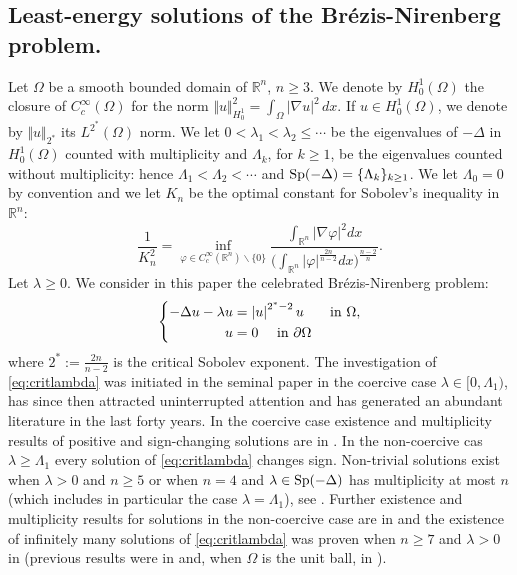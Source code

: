 \documentclass[10pt]{amsart}
\numberwithin{equation}{section}
\newcommand{\R}{\mathbb{R}}
\newcommand{\Sp}{{\rm Sp}}
\newcommand{\vp}{\varphi}
\newcommand{\Om}{\Omega}
\def \rr {\mathbb{R}}
\def \crit{2^{*}}
\theoremstyle{plain}
\theoremstyle{remark}
\begin{document}
\subsection{Least-energy solutions of the Br\'ezis-Nirenberg problem.} Let $\Omega$ be a smooth bounded domain of  $\rr^n$,  $n\geq 3$. We denote by $H_0^1(\Om)$ the closure of $C_c^{\infty}(\Om)$ for the norm $\Vert u \Vert_{H^1_0}^2 =  \int_{\Om} |\nabla u|^2\, dx$. If $u \in H^1_0(\Om)$, we denote by $\Vert u \Vert_{2^*}$ its $L^{2^*}(\Om)$ norm. We let  $0< \lambda_1 < \lambda_2 \le \cdots$ be the eigenvalues of $-\Delta$ in $H^1_0(\Om)$ counted with multiplicity and $\Lambda_k$, for $k \ge 1$, be the eigenvalues counted without multiplicity: hence $\Lambda_1 < \Lambda_2< \cdots$ and $\Sp(-\Delta) = \{ \Lambda_k\}_{k \ge 1}$. We let $\Lambda_0 = 0$ by convention and we let $K_n$ be the optimal constant for Sobolev's inequality in $\R^n$: 
\begin{equation} \label{defK0}
 \frac{1}{K_n^2} = \inf_{\vp \in C^\infty_c(\R^n) \backslash \{0\}} \frac{\int_{\R^n}|\nabla \vp|^2 dx}{\big(\int_{\R^n} |\vp|^{\frac{2n}{n-2}}dx \big)^{\frac{n-2}{n}}}. 
 \end{equation}
Let $\lambda \ge 0$. We consider in this paper the celebrated Br\'ezis-Nirenberg problem: 
\begin{equation}\label{eq:critlambda}
	\left\{\begin{aligned}
		-\Delta u -\lambda u & =\left|u\right|^{\crit-2}u &\hbox{ in } \Omega, \\
		u & = 0 \quad \text{ in } \partial \Om
	\end{aligned}\right.
\end{equation}
where $\crit:=\frac{2n}{n-2}$ is the critical Sobolev exponent. The investigation of \eqref{eq:critlambda} was initiated in the seminal paper \cite{BN} in the coercive case $\lambda \in [0, \Lambda_1)$, has since then  attracted uninterrupted attention and has generated an abundant literature in the last forty years. In the coercive case existence and multiplicity results of positive and sign-changing solutions are in \cite{BN, CapozziFortunatoPalmieri, CeramiSoliminiStruwe, ChenZou, ClappWeth2, FortunatoJannelli, HebeyVaugonNodal, RoselliWillem, TavaresYouZou}. In the non-coercive cas $\lambda \ge \Lambda_1$ every solution of \eqref{eq:critlambda} changes sign. Non-trivial solutions exist when $\lambda >0$ and $n \ge 5$ \cite{CapozziFortunatoPalmieri} or when $n = 4$ and $\lambda \in \Sp(-\Delta)$ has multiplicity at most $n$ (which includes in particular the case $\lambda = \Lambda_1$), see \cite{ClappWeth2}. Further existence and multiplicity results for solutions in the non-coercive case are  in \cite{ABP2, CeramiFortunatoStruwe, ClappWeth2, DevillanovaSolimini, FortunatoJannelli, SchechterZou, Solimini} and the existence of infinitely many solutions of \eqref{eq:critlambda} was proven when $n \ge 7$ and $\lambda >0$ in \cite{SchechterZou} (previous results were in \cite{DevillanovaSolimini} and, when $\Om$ is the unit ball, in \cite{FortunatoJannelli, Solimini}).
\end{document}

